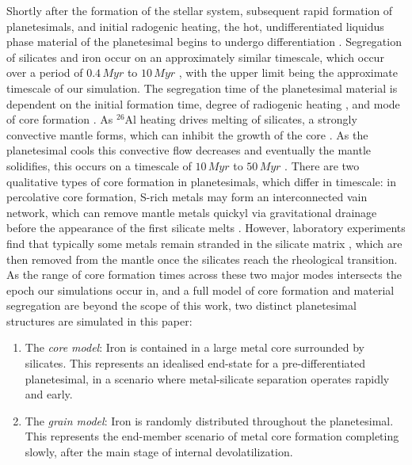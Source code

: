 \documentclass[fleqn,usenatbib]{mnras}
\newcommand{\atom}[2]{$^{#2}\text{#1}$}
\newcommand{\al}{\atom{Al}{26}}
\begin{document}


Shortly after the formation of the stellar system, subsequent rapid formation of planetesimals, and initial radogenic heating, the hot, undifferentiated liquidus phase material of the planetesimal begins to undergo differentiation \citep{2015GMS...212...83N}.
Segregation of silicates and iron occur on an approximately similar timescale, which occur over a period of $0.4\,\si{Myr}$ to $10\,\si{Myr}$ \citep{2019E&PSL.507..154L}, with the upper limit being the approximate timescale of our simulation.
The segregation time of the planetesimal material is dependent on the initial formation time, degree of radiogenic heating \citep{doddsThermalEvolutionPlanetesimals2021}, and mode of core formation \citep{2020E&PSL.54616419W}.
As \al{} heating drives melting of silicates, a strongly convective mantle forms, which can inhibit the growth of the core \citep{neumannDifferentiationCoreFormation2012}.
As the planetesimal cools this convective flow decreases and eventually the mantle solidifies, this occurs on a timescale of $10\,\si{Myr}$ to $50\,\si{Myr}$ \citep{neumannMultistageCoreFormation2018}.
There are two qualitative types of core formation in planetesimals, which differ in timescale: in percolative core formation, S-rich metals may form an interconnected vain network, which can remove mantle metals quickyl via gravitational drainage before the appearance of the first silicate melts \citep{2003Natur.422..154Y,2017PNAS..11413406G}. However, laboratory experiments find that typically some metals remain stranded in the silicate matrix \citep{2009E&PSL.288...84B,2015E&PSL.417...67C,2023E&PSL.61718247W}, which are then removed from the mantle once the silicates reach the rheological transition.
As the range of core formation times across these two major modes intersects the epoch our simulations occur in, and a full model of core formation and material segregation are beyond the scope of this work, two distinct planetesimal structures are simulated in this paper:

\begin{enumerate}
  \item The \emph{core model}: Iron is contained in a large metal core surrounded by silicates. This represents an idealised end-state for a pre-differentiated planetesimal, in a scenario where metal-silicate separation operates rapidly and early.
  \item The \emph{grain model}: Iron is randomly distributed throughout the planetesimal. This represents the end-member scenario of metal core formation completing slowly, after the main stage of internal devolatilization.
\end{enumerate}
    
\end{document}
